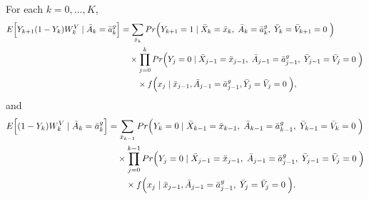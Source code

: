 \begin{tcolorbox}[title=IPW Lemma 3]
For each \(k = 0, \ldots, K\),
\begin{align*}
E\Bigl[Y_{k+1}(1 - Y_k)W_k^V\mid \bar{A}_k = \bar{a}^g_k \Bigr] &= \sum_{\bar{x}_k} Pr\Bigl(Y_{k+1} = 1\mid \bar{X}_k = \bar{x}_k,\; \bar{A}_k = \bar{a}^g_k,\; \bar{Y}_k = \bar{V}_{k+1} = 0\;\Bigr) \nonumber\\
&\quad \times \prod_{j=0}^k Pr\Bigl(Y_j = 0\mid \bar{X}_{j-1} = \bar{x}_{j-1},\; \bar{A}_{j-1} = \bar{a}^g_{j-1},\; \bar{Y}_{j-1} = \bar{V}_j = 0\; \Bigr) \, \\
&\quad \quad \times f\Bigl(x_j\mid \bar{x}_{j-1}, \bar{A}_{j-1} = \bar{a}^g_{j-1}, \bar{Y}_j = \bar{V}_j = 0\; \Bigr),
\end{align*}
and
\begin{align*}
E\Bigl[(1 - Y_k)W_k^V\mid \bar{A}_k = \bar{a}^g_k\Bigr] &= \sum_{\bar{x}_{k-1}} Pr\Bigl(Y_k = 0\mid \bar{X}_{k-1} = \bar{x}_{k-1},\; \bar{A}_{k-1} = \bar{a}^g_{k-1},\; \bar{Y}_{k-1} = \bar{V}_k = 0\; \Bigr) \nonumber\\
&\quad \times \prod_{j=0}^{k-1} Pr\Bigl(Y_j = 0\mid \bar{X}_{j-1} = \bar{x}_{j-1},\; \bar{A}_{j-1} = \bar{a}^g_{j-1},\; \bar{Y}_{j-1} = \bar{V}_j = 0\; \Bigr) \\
& \quad \quad \times  f\Bigl(x_j\mid \bar{x}_{j-1}, \bar{A}_{j-1} = \bar{a}^g_{j-1},\; \bar{Y}_j = \bar{V}_j = 0\; \Bigr).
\end{align*}
\end{tcolorbox}

